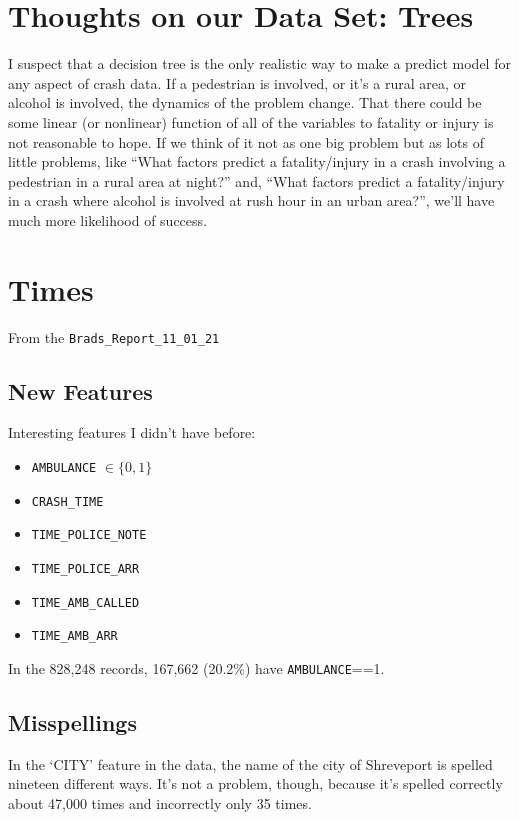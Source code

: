 \section{Thoughts on our Data Set:  Trees}

I suspect that a decision tree is the only realistic way to make a predict model for any aspect of crash data.  If a pedestrian is involved, or it's a rural area, or alcohol is involved, the dynamics of the problem change.  That there could be some linear (or nonlinear) function of all of the variables to fatality or injury is not reasonable to hope.  If we think of it not as one big problem but as lots of little problems, like ``What factors predict a fatality/injury in a crash involving a pedestrian in a rural area at night?'' and, ``What factors predict a fatality/injury in a crash where alcohol is involved at rush hour in an urban area?'',  we'll have much more likelihood of success.  


\section{Times}

From the \verb|Brads_Report_11_01_21|

\subsection{New Features}
Interesting features I didn't have before:

\begin{itemize}
	\item \verb|AMBULANCE| $\in \{0,1\}$
	\item \verb|CRASH_TIME|
	\item \verb|TIME_POLICE_NOTE|
	\item \verb|TIME_POLICE_ARR|
	\item \verb|TIME_AMB_CALLED|
	\item \verb|TIME_AMB_ARR|
\end{itemize}

In the 828,248 records, 167,662 (20.2\%) have \verb|AMBULANCE|==1.

\subsection{Misspellings}

In the `CITY' feature in the data, the name of the city of Shreveport is spelled nineteen different ways.  It's not a problem, though, because it's spelled correctly about 47,000 times and incorrectly only 35 times.  

